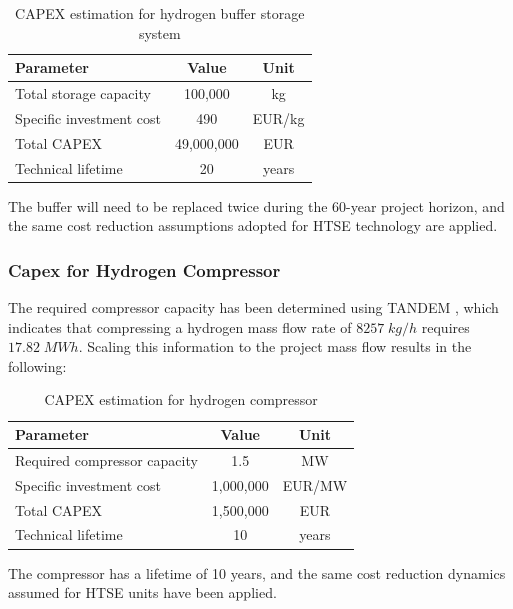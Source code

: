 \begin{table}[H]
    \centering
    \begin{tabular}{lcc}
        \hline
        \textbf{Parameter} & \textbf{Value} & \textbf{Unit} \\
        \hline
        Total storage capacity & 100,000 & kg \\
        Specific investment cost & 490 & EUR/kg \\
        Total CAPEX & 49,000,000 & EUR \\
        Technical lifetime & 20 & years \\
        \hline
    \end{tabular}
    \caption{CAPEX estimation for hydrogen buffer storage system}
    \label{tab:hydrogen_buffer_capex}
\end{table}

The buffer will need to be replaced twice during the 60-year project horizon, and the same cost reduction assumptions adopted for HTSE technology are applied.

\subsubsection {Capex for Hydrogen Compressor}
The required compressor capacity has been determined using TANDEM \cite{TANDEM2023}, which indicates that compressing a hydrogen mass flow rate of $8257 \; kg/h$ requires $17.82 \; MWh$. Scaling this information to the project mass flow results in the following:

\begin{table}[H]
    \centering
    \begin{tabular}{lcc}
        \hline
        \textbf{Parameter} & \textbf{Value} & \textbf{Unit} \\
        \hline
        Required compressor capacity & 1.5 & MW \\
        Specific investment cost & 1,000,000 & EUR/MW \\
        Total CAPEX & 1,500,000 & EUR \\
        Technical lifetime & 10 & years \\
        \hline
    \end{tabular}
    \caption{CAPEX estimation for hydrogen compressor}
    \label{tab:compressor_capex}
\end{table}

The compressor has a lifetime of 10 years, and the same cost reduction dynamics assumed for HTSE units have been applied.

